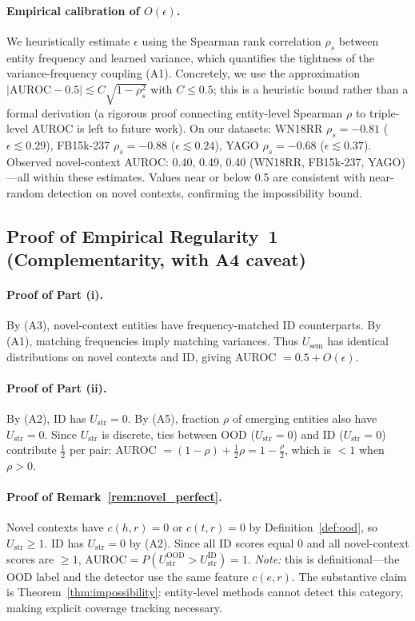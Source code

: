 \documentclass{article}
\begin{document}
\paragraph{Empirical calibration of $O(\epsilon)$.}
We heuristically estimate $\epsilon$ using the Spearman rank correlation $\rho_s$ between entity frequency and learned variance, which quantifies the tightness of the variance-frequency coupling (A1). Concretely, we use the approximation $|\text{AUROC} - 0.5| \lesssim C \sqrt{1 - \rho_s^2}$ with $C \leq 0.5$; this is a heuristic bound rather than a formal derivation (a rigorous proof connecting entity-level Spearman $\rho$ to triple-level AUROC is left to future work). On our datasets: WN18RR $\rho_s {=} {-}0.81$ ($\epsilon \lesssim 0.29$), FB15k-237 $\rho_s {=} {-}0.88$ ($\epsilon \lesssim 0.24$), YAGO $\rho_s {=} {-}0.68$ ($\epsilon \lesssim 0.37$). Observed novel-context AUROC: 0.40, 0.49, 0.40 (WN18RR, FB15k-237, YAGO)---all within these estimates. Values near or below 0.5 are consistent with near-random detection on novel contexts, confirming the impossibility bound.

\subsection{Proof of Empirical Regularity~1 (Complementarity, with A4 caveat)}

\paragraph{Proof of Part (i).}
By (A3), novel-context entities have frequency-matched ID counterparts. By (A1), matching frequencies imply matching variances. Thus $U_{\text{sem}}$ has identical distributions on novel contexts and ID, giving AUROC $= 0.5 + O(\epsilon)$.

\paragraph{Proof of Part (ii).}
By (A2), ID has $U_{\text{str}} = 0$. By (A5), fraction $\rho$ of emerging entities also have $U_{\text{str}} = 0$. Since $U_{\text{str}}$ is discrete, ties between OOD ($U_{\text{str}}=0$) and ID ($U_{\text{str}}=0$) contribute $\tfrac{1}{2}$ per pair: AUROC $= (1 - \rho) + \tfrac{1}{2}\rho = 1 - \tfrac{\rho}{2}$, which is $< 1$ when $\rho > 0$.

\paragraph{Proof of Remark~\ref{rem:novel_perfect}.}
Novel contexts have $c(h,r) = 0$ or $c(t,r) = 0$ by Definition~\ref{def:ood}, so $U_{\text{str}} \geq 1$. ID has $U_{\text{str}} = 0$ by (A2). Since all ID scores equal 0 and all novel-context scores are $\geq 1$, $\text{AUROC} = P(U_{\text{str}}^{\text{OOD}} > U_{\text{str}}^{\text{ID}}) = 1$. \emph{Note:} this is definitional---the OOD label and the detector use the same feature $c(e,r)$. The substantive claim is Theorem~\ref{thm:impossibility}: entity-level methods cannot detect this category, making explicit coverage tracking necessary.
\end{document}
